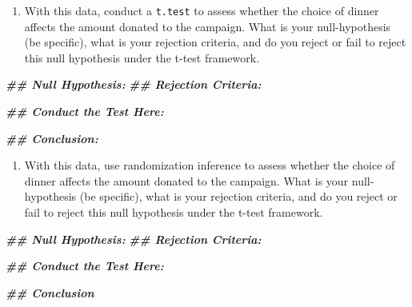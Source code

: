 \documentclass[
]{article}
\newenvironment{Shaded}{\begin{snugshade}}{\end{snugshade}}
\newcommand{\DocumentationTok}[1]{\textcolor[rgb]{0.56,0.35,0.01}{\textbf{\textit{#1}}}}
\providecommand{\tightlist}{%
  \setlength{\itemsep}{0pt}\setlength{\parskip}{0pt}}
\theoremstyle{definition}
\theoremstyle{definition}
\theoremstyle{definition}
\theoremstyle{definition}
\theoremstyle{remark}
\begin{document}
\begin{enumerate}
\def\labelenumi{\arabic{enumi}.}
\tightlist
\item
  With this data, conduct a \texttt{t.test} to assess whether the choice of dinner affects the amount donated to the campaign. What is your null-hypothesis (be specific), what is your rejection criteria, and do you reject or fail to reject this null hypothesis under the t-test framework.
\end{enumerate}

\begin{Shaded}
\begin{Highlighting}[]
\DocumentationTok{\#\# Null Hypothesis: }
\DocumentationTok{\#\# Rejection Criteria: }

\DocumentationTok{\#\# Conduct the Test Here: }

\DocumentationTok{\#\# Conclusion: }
\end{Highlighting}
\end{Shaded}

\begin{enumerate}
\def\labelenumi{\arabic{enumi}.}
\setcounter{enumi}{1}
\tightlist
\item
  With this data, use randomization inference to assess whether the choice of dinner affects the amount donated to the campaign. What is your null-hypothesis (be specific), what is your rejection criteria, and do you reject or fail to reject this null hypothesis under the t-test framework.
\end{enumerate}

\begin{Shaded}
\begin{Highlighting}[]
\DocumentationTok{\#\# Null Hypothesis: }
\DocumentationTok{\#\# Rejection Criteria: }

\DocumentationTok{\#\# Conduct the Test Here:}

\DocumentationTok{\#\# Conclusion}
\end{Highlighting}
\end{Shaded}
\end{document}
